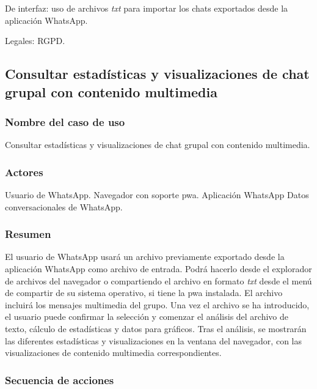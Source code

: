 De interfaz: uso de archivos \textit{txt} para importar los chats exportados desde la aplicación WhatsApp. 

Legales: RGPD.







\subsection{Consultar estadísticas y visualizaciones de chat grupal con contenido multimedia}

\subsubsection{Nombre del caso de uso} Consultar estadísticas y visualizaciones de chat grupal con contenido multimedia.

\subsubsection{Actores}

Usuario de WhatsApp.
Navegador con soporte \acrfull{pwa}.
Aplicación WhatsApp
Datos conversacionales de WhatsApp.

\subsubsection{Resumen} El usuario de WhatsApp usará un archivo previamente exportado desde la aplicación WhatsApp como archivo de entrada. Podrá hacerlo desde el explorador de archivos del navegador o compartiendo el archivo en formato \textit{txt} desde el menú de compartir de su sistema operativo, si tiene la \acrfull{pwa} instalada. El archivo incluirá los mensajes multimedia del grupo. Una vez el archivo se ha introducido, el usuario puede confirmar la selección y comenzar el análisis del archivo de texto, cálculo de estadísticas y datos para gráficos. Tras el análisis, se mostrarán las diferentes estadísticas y visualizaciones en la ventana del navegador, con las visualizaciones de contenido multimedia correspondientes.

\subsubsection{Secuencia de acciones}

